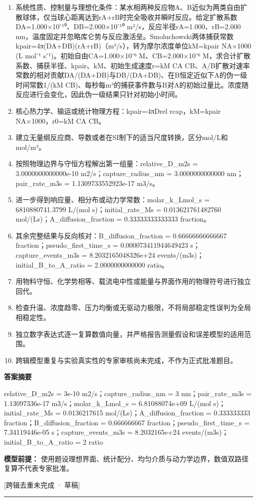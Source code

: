 \documentclass[UTF8,11pt,a4paper]{ctexart}
\begin{document}
\begin{enumerate}
\item 系统性质、控制量与理想化条件：某水相两种反应物A、B近似为两类自由扩散球体，仅当球心距离达到rA+rB时完全吸收并瞬时反应。给定扩散系数DA=1.000×10⁻¹⁰、DB=2.000×10⁻¹⁰ m²/s，反应半径rA=1.000、rB=2.000 nm，温度固定并忽略库仑势与反应激活垒。Smoluchowski两体捕获常数kpair=4π(DA+DB)(rA+rB)（m³/s），转为摩尔浓度单位kM=kpair NA×1000 (L mol⁻¹ s⁻¹)。初始自由CA=1.000×10⁻⁶ M、CB=2.000×10⁻⁶ M，求合计扩散系数、捕获半径、kpair、kM、初始生成速度r=kM CA CB、A/B扩散对速率常数的相对贡献DA/(DA+DB)与DB/(DA+DB)、在B恒定近似下A的伪一级时间常数1/(kM CB)、每秒每m³的捕获事件数与B对A的初始过量比。浓度随反应进行会变化，因此伪一级结果只针对初始小时间。
\item 核心热力学、输运或统计物理方程：kpair=4πDrel rcap，kM=kpair NA×1000，r0=kM CA CB。
\item 建立无量纲反应商、导数或者在SI制下的适当尺度转换，区分mol/L和mol/m³。
\item 按照物理边界与守恒方程解出第一组量：relative\_D\_m2s = 3.0000000000000e-10 m2/s；capture\_radius\_nm = 3.0000000000000 nm；pair\_rate\_m3s = 1.1309733552923e-17 m3/s。
\item 进一步得到响应量、相分布或动力学常数：molar\_k\_Lmol\_s = 6810880741.3799 L/(mol s)；initial\_rate\_Ms = 0.013621761482760 mol/(Ls)；A\_diffusion\_fraction = 0.33333333333333 fraction。
\item 其余完整结果与反向核对：B\_diffusion\_fraction = 0.66666666666667 fraction；pseudo\_first\_time\_s = 0.000073411944649423 s；capture\_events\_m3s = 8.2032165048326e+24 events/(m3s)；initial\_B\_to\_A\_ratio = 2.0000000000000 ratio。
\item 用物料守恒、化学势相等、载流电中性或能量与界面作用的物理符号进行独立回代。
\item 检查升温、浓度趋零、压力均衡或无驱动力极限，不将局部稳定性误判为全局相稳定性。
\item 独立数字表达式逐一复算数值向量，并严格报告测量假设和误差模型的适用范围。
\item 跨辑模型重复与实验真实性的专家审核尚未完成，不作为正式批准题目。
\end{enumerate}
\noindent\textbf{答案摘要}\par
relative\_D\_m2s = 3e-10 m2/s；capture\_radius\_nm = 3 nm；pair\_rate\_m3s = 1.13097336e-17 m3/s；molar\_k\_Lmol\_s = 6.81088074e+09 L/(mol s)；initial\_rate\_Ms = 0.0136217615 mol/(Ls)；A\_diffusion\_fraction = 0.333333333 fraction；B\_diffusion\_fraction = 0.666666667 fraction；pseudo\_first\_time\_s = 7.34119446e-05 s；capture\_events\_m3s = 8.2032165e+24 events/(m3s)；initial\_B\_to\_A\_ratio = 2 ratio\par
\noindent\textbf{模型前提：}
使用题设理想界面、统计配分、均匀介质与动力学边界，数值双路径复算不代表专家批准。\par
\noindent\textcolor{red!65!black}{[跨辑去重未完成 · 草稿]} \par
\medskip\hrule\medskip
{}
\end{document}
